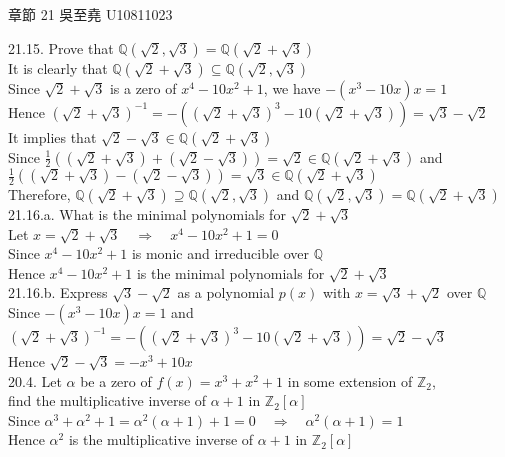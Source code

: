 \documentclass[12pt]{book}
\author{andersonwu2000}
\begin{document}
\begin{CJK}{UTF8}{bsmi}

\hfill 章節 21 吳至堯 U10811023

21.15. Prove that $\mathbb{Q}(\sqrt{2}, \sqrt{3})=\mathbb{Q}(\sqrt{2}+\sqrt{3})$ \\
It is clearly that $\mathbb{Q}(\sqrt{2}+\sqrt{3})\subseteq\mathbb{Q}(\sqrt{2}, \sqrt{3})$ \\
Since $\sqrt{2}+\sqrt{3}$ is a zero of $x^4-10x^2+1$, we have $-(x^3-10x)x=1$ \\
Hence $(\sqrt{2}+\sqrt{3})^{-1}=-((\sqrt{2}+\sqrt{3})^3-10(\sqrt{2}+\sqrt{3}))=\sqrt{3}-\sqrt{2}$ \\
It implies that $\sqrt{2}-\sqrt{3}\in\mathbb{Q}(\sqrt{2}+\sqrt{3})$ \\
Since $\frac{1}{2}((\sqrt{2}+\sqrt{3})+(\sqrt{2}-\sqrt{3}))=\sqrt{2}\in\mathbb{Q}(\sqrt{2}+\sqrt{3})$ and $\frac{1}{2}((\sqrt{2}+\sqrt{3})-(\sqrt{2}-\sqrt{3}))=\sqrt{3}\in\mathbb{Q}(\sqrt{2}+\sqrt{3})$ \\
Therefore, $\mathbb{Q}(\sqrt{2}+\sqrt{3})\supseteq\mathbb{Q}(\sqrt{2}, \sqrt{3})$ and $\mathbb{Q}(\sqrt{2}, \sqrt{3})=\mathbb{Q}(\sqrt{2}+\sqrt{3})$ \\

21.16.a. What is the minimal polynomials for $\sqrt{2}+\sqrt{3}$ \\
Let $x=\sqrt{2}+\sqrt{3}\quad\Rightarrow\quad x^4-10x^2+1=0$ \\
Since $x^4-10x^2+1$ is monic and irreducible over $\mathbb{Q}$ \\
Hence $x^4-10x^2+1$ is the minimal polynomials for $\sqrt{2}+\sqrt{3}$ \\

21.16.b. Express $\sqrt{3}-\sqrt{2}$ as a polynomial $p(x)$ with $x=\sqrt{3}+\sqrt{2}$ over $\mathbb{Q}$ \\
Since $-(x^3-10x)x=1$ and $(\sqrt{2}+\sqrt{3})^{-1}=-((\sqrt{2}+\sqrt{3})^3-10(\sqrt{2}+\sqrt{3}))=\sqrt{2}-\sqrt{3}$ \\
Hence $\sqrt{2}-\sqrt{3}=-x^3+10x$ \\

20.4. Let $\alpha$ be a zero of $f(x)=x^3+x^2+1$ in some extension of $\mathbb{Z}_2$, \\
\hspace*{2em} find the multiplicative inverse of $\alpha+1$ in $\mathbb{Z}_2[\alpha]$ \\
Since $\alpha^3+\alpha^2+1=\alpha^2(\alpha+1)+1=0\quad\Rightarrow\quad\alpha^2(\alpha+1)=1$ \\
Hence $\alpha^2$ is the multiplicative inverse of $\alpha+1$ in $\mathbb{Z}_2[\alpha]$ \\


\end{CJK}
\end{document}
